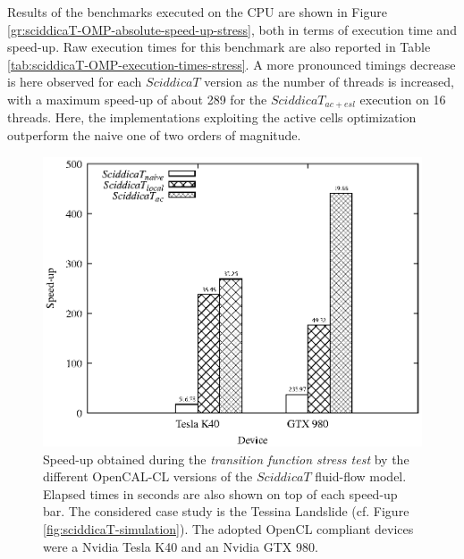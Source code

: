Results of the benchmarks executed on the CPU are shown in Figure
\ref{gr:sciddicaT-OMP-absolute-speed-up-stress}, both in terms of
execution time and speed-up. Raw execution times for this benchmark are also reported in Table \ref{tab:sciddicaT-OMP-execution-times-stress}.
A more pronounced
timings decrease is here observed for each $SciddicaT$ version as
the number of threads is increased, with a maximum speed-up of
about 289 for the $SciddicaT_{ac+esl}$ execution on 16
threads. Here, the implementations exploiting the active cells
optimization outperform the naive one of two orders of magnitude.

\begin{figure}
	\begin{center}
		\includegraphics[width=1.0\textwidth]{./images/opencal/Figure10_new}
		\caption{Speed-up obtained during the \emph{transition
				function stress test} by the different OpenCAL-CL versions
			of the $SciddicaT$ fluid-flow model. Elapsed times in
			seconds are also shown on top of each speed-up bar. The
			considered case study is the Tessina Landslide (cf. Figure
			\ref{fig:sciddicaT-simulation}). The adopted OpenCL
			compliant devices were a Nvidia Tesla K40 and an Nvidia GTX
			980.}
		\label{gr:sciddicaT-CL-absolute-speed-up-stress}
	\end{center}
\end{figure}
